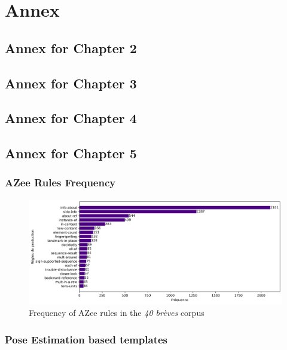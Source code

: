 \documentclass[../main.tex]{subfiles}
\begin{document}
\chapter{Annex}

\section{Annex for Chapter 2}


\section{Annex for Chapter 3}

\section{Annex for Chapter 4}

\section{Annex for Chapter 5}
\label{app:intermediate_blocks_pose_correction}

\subsection{AZee Rules Frequency}
\label{app:intermediate_blocks_pose_correction:azee_rules_frequency}

\begin{figure}[h]
    \centering
    \includegraphics[width=5in]{chapters/intermediate_blocks_pose_correction/images/azee_rule_frequency.png}
    \caption{Frequency of AZee rules in the \emph{40 brèves} corpus}
    \label{fig:azee_rule_frequency_ch1}
\end{figure}

\subsection{Pose Estimation based templates}
\label{app:intermediate_blocks_pose_correction:pose_est_templates}
\end{document}
